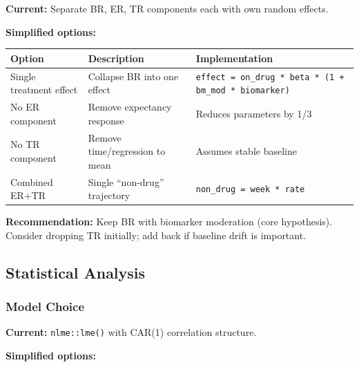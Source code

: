 \documentclass[11pt,letterpaper]{article}
\begin{document}
\textbf{Current:} Separate BR, ER, TR components each with own random
effects.

\textbf{Simplified options:}

\begin{table}[h]
\centering\small
\begin{tabular}{@{}L{3.5cm}L{4.5cm}L{5.5cm}@{}}
\toprule
Option & Description & Implementation \\
\midrule
Single treatment effect & Collapse BR into one effect & \texttt{effect = on\_drug * beta * (1 + bm\_mod * biomarker)} \\
No ER component & Remove expectancy response & Reduces parameters by 1/3 \\
No TR component & Remove time/regression to mean & Assumes stable baseline \\
Combined ER+TR & Single ``non-drug'' trajectory & \texttt{non\_drug = week * rate} \\
\bottomrule
\end{tabular}
\end{table}

\textbf{Recommendation:} Keep BR with biomarker moderation (core
hypothesis). Consider dropping TR initially; add back if baseline drift
is important.

\subsection{Statistical Analysis}

\subsubsection{Model Choice}

\textbf{Current:} \texttt{nlme::lme()} with CAR(1) correlation structure.

\textbf{Simplified options:}
\end{document}
